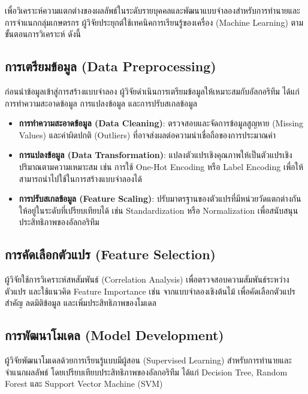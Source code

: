 เพื่อวิเคราะห์ความแตกต่างของผลลัพธ์ในระดับรายบุคคลและพัฒนาแบบจำลองสำหรับการทำนายและการจำแนกกลุ่มเกษตรกร ผู้วิจัยประยุกต์ใช้เทคนิคการเรียนรู้ของเครื่อง (Machine Learning) ตามขั้นตอนการวิเคราะห์ ดังนี้

\subsection{การเตรียมข้อมูล (Data Preprocessing)}

ก่อนนำข้อมูลเข้าสู่การสร้างแบบจำลอง ผู้วิจัยดำเนินการเตรียมข้อมูลให้เหมาะสมกับอัลกอริทึม ได้แก่ การทำความสะอาดข้อมูล การแปลงข้อมูล และการปรับสเกลข้อมูล

\begin{itemize}
\item \textbf{การทำความสะอาดข้อมูล (Data Cleaning)}: ตรวจสอบและจัดการข้อมูลสูญหาย (Missing Values) และค่าผิดปกติ (Outliers) ที่อาจส่งผลต่อความน่าเชื่อถือของการประมาณค่า

\item \textbf{การแปลงข้อมูล (Data Transformation)}: แปลงตัวแปรเชิงคุณภาพให้เป็นตัวแปรเชิงปริมาณตามความเหมาะสม เช่น การใช้ One-Hot Encoding หรือ Label Encoding เพื่อให้สามารถนำไปใช้ในการสร้างแบบจำลองได้

\item \textbf{การปรับสเกลข้อมูล (Feature Scaling)}: ปรับมาตรฐานของตัวแปรที่มีหน่วยวัดแตกต่างกันให้อยู่ในระดับที่เปรียบเทียบได้ เช่น Standardization หรือ Normalization เพื่อสนับสนุนประสิทธิภาพของอัลกอริทึม
\end{itemize}

\subsection{การคัดเลือกตัวแปร (Feature Selection)}

ผู้วิจัยใช้การวิเคราะห์สหสัมพันธ์ (Correlation Analysis) เพื่อตรวจสอบความสัมพันธ์ระหว่างตัวแปร และใช้แนวคิด Feature Importance เช่น จากแบบจำลองเชิงต้นไม้ เพื่อคัดเลือกตัวแปรสำคัญ ลดมิติข้อมูล และเพิ่มประสิทธิภาพของโมเดล

\subsection{การพัฒนาโมเดล (Model Development)}

ผู้วิจัยพัฒนาโมเดลด้วยการเรียนรู้แบบมีผู้สอน (Supervised Learning) สำหรับการทำนายและจำแนกผลลัพธ์ โดยเปรียบเทียบประสิทธิภาพของอัลกอริทึม ได้แก่ Decision Tree, Random Forest และ Support Vector Machine (SVM)

